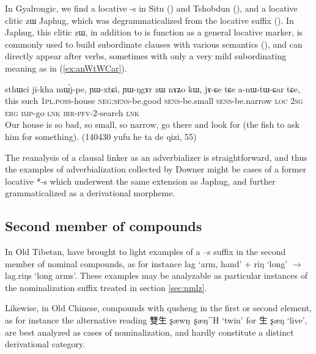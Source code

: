 \documentclass[oldfontcommands,oneside,a4paper,11pt]{article}
\newcommand{\ipa}[1]{{\phon \mbox{#1}}} %
\newcommand{\zh}[1]{{\cn #1}}
\newcommand{\ch}[3]{\zh{#1} \ipa{#2} `#3'}
\begin{document}
In Gyalrongic, we find a locative \ipa{-s} in Situ (\citealt{linxr93jiarong}) and Tshobdun (\citealt[129]{jackson98morphology}), and a locative clitic \ipa{zɯ} Japhug, which was degrammaticalized from the locative suffix (\citealt[167-9]{jacques08}). In Japhug, this clitic \ipa{zɯ}, in addition to is function as a general locative marker, is commonly used to build subordinate clauses with various semantics (\citealt[275;293]{jacques14linking}), and can directly appear after verbs, sometimes with only a very mild subordinating meaning as in (\ref{ex:anWtWCar}).

\begin{exe}
\ex \label{ex:anWtWCar}
\gll \ipa{kɯki} 	\ipa{sthɯci} 	\ipa{ji-kha} 	\ipa{mɯ́j-pe,} 	\ipa{ɲɯ-xtɕi,} 	\ipa{ɲɯ-ŋgɤr} 	\ipa{zɯ} 	\ipa{nɤʑo} 	\ipa{kɯ,}  \ipa{jɤ-ɕe} 	\ipa{tɕe} 	\ipa{a-nɯ-tɯ-ɕar} 	\ipa{tɕe,}  \\
this such \textsc{1pl.poss}-house \textsc{neg:sens}-be.good  \textsc{sens}-be.small  \textsc{sens}-be.narrow \textsc{loc} \textsc{2sg} \textsc{erg} \textsc{imp}-go \textsc{lnk}  \textsc{irr-pfv}-2-search \textsc{lnk} \\
\glt Our house is so bad, so small, so narrow, go there and look for (the fish to ask him for something). (140430 yufu he ta de qizi, 55)
\end{exe}
The reanalysis of a clausal linker as an adverbializer is straightforward, and thus the examples of adverbialization collected by Downer might be cases of a former locative *\ipa{-s} which underwent the same extension as Japhug, and further grammaticalized as a derivational morpheme.
 

\subsection{Second member of compounds}
In Old Tibetan, \citet{uebach08rjeblas} have brought to light examples of a \ipa{--s} suffix in the second member of nominal compounds, as for instance \ipa{lag} `arm, hand' + \ipa{riŋ} `long' $\rightarrow$ \ipa{lag.riŋs} `long arms'. These examples may be analyzable as particular instances of the nominalization suffix treated in section \ref{sec:nmlz}.

Likewise, in Old Chinese, compounds with qusheng in the first or second element, as for instance the alternative reading \ch{雙生}{ʂæwŋ ʂæŋ^H}{twin} for \ch{生}{ʂæŋ}{live}, are best analyzed as cases of nominalization, and hardly constitute a distinct derivational category.
 
\end{document}
